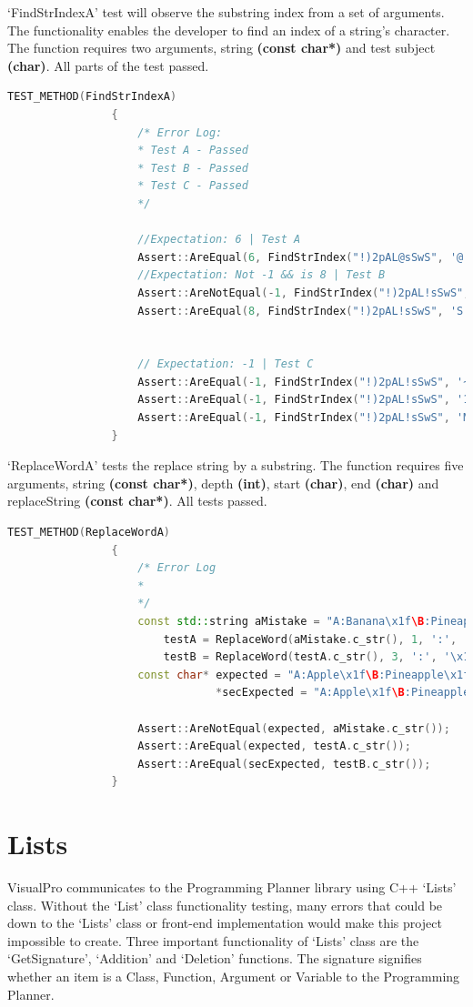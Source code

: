 \documentclass[12pt]{report} %
\begin{document}
			`FindStrIndexA' test will observe the substring index from a set of arguments. The functionality enables the developer to find an index of a string's character. The function requires two arguments, string \textbf{(const char*)} and test subject \textbf{(char)}. All parts of the test passed.
			\begin{lstlisting}[language=c++]
				TEST_METHOD(FindStrIndexA)
				{
					/* Error Log:
					* Test A - Passed
					* Test B - Passed
					* Test C - Passed
					*/

					//Expectation: 6 | Test A
					Assert::AreEqual(6, FindStrIndex("!)2pAL@sSwS", '@'));
					//Expectation: Not -1 && is 8 | Test B
					Assert::AreNotEqual(-1, FindStrIndex("!)2pAL!sSwS", 'S'));
					Assert::AreEqual(8, FindStrIndex("!)2pAL!sSwS", 'S'));


					// Expectation: -1 | Test C
					Assert::AreEqual(-1, FindStrIndex("!)2pAL!sSwS", '~'));
					Assert::AreEqual(-1, FindStrIndex("!)2pAL!sSwS", '1'));
					Assert::AreEqual(-1, FindStrIndex("!)2pAL!sSwS", 'M'));
				}
			\end{lstlisting}

			`ReplaceWordA' tests the replace string by a substring. The function requires five arguments, string \textbf{(const char*)}, depth \textbf{(int)}, start \textbf{(char)}, end \textbf{(char)} and replaceString \textbf{(const char*)}. All tests passed.
			\begin{lstlisting}[language=c++]
				TEST_METHOD(ReplaceWordA)
				{
					/* Error Log
					* 
					*/
					const std::string aMistake = "A:Banana\x1f\B:Pineapple\x1f\C:Grapefruit",
						testA = ReplaceWord(aMistake.c_str(), 1, ':', '\x1f', "Apple"),
						testB = ReplaceWord(testA.c_str(), 3, ':', '\x1f', "Banana");
					const char* expected = "A:Apple\x1f\B:Pineapple\x1f\C:Grapefruit",
								*secExpected = "A:Apple\x1f\B:Pineapple\x1f\C:Banana";

					Assert::AreNotEqual(expected, aMistake.c_str());
					Assert::AreEqual(expected, testA.c_str());
					Assert::AreEqual(secExpected, testB.c_str());
				}
			\end{lstlisting}
		\section{Lists}
			VisualPro communicates to the Programming Planner library using C++ `Lists' class. Without the `List' class functionality testing, many errors that could be down to the `Lists' class or front-end implementation would make this project impossible to create. Three important functionality of `Lists' class are the `GetSignature', `Addition' and `Deletion' functions. The signature signifies whether an item is a Class, Function, Argument or Variable to the Programming Planner.
            
\end{document}
